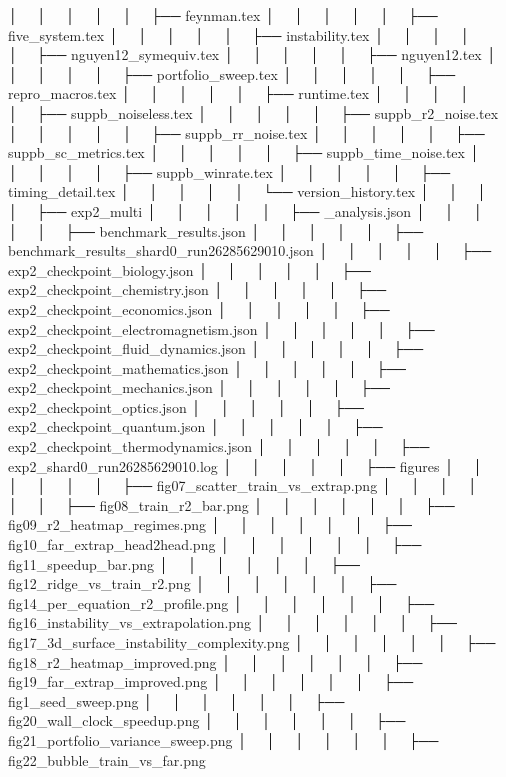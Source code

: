 │   │       │   │   │       ├── feynman.tex
│   │       │   │   │       ├── five_system.tex
│   │       │   │   │       ├── instability.tex
│   │       │   │   │       ├── nguyen12_symequiv.tex
│   │       │   │   │       ├── nguyen12.tex
│   │       │   │   │       ├── portfolio_sweep.tex
│   │       │   │   │       ├── repro_macros.tex
│   │       │   │   │       ├── runtime.tex
│   │       │   │   │       ├── suppb_noiseless.tex
│   │       │   │   │       ├── suppb_r2_noise.tex
│   │       │   │   │       ├── suppb_rr_noise.tex
│   │       │   │   │       ├── suppb_sc_metrics.tex
│   │       │   │   │       ├── suppb_time_noise.tex
│   │       │   │   │       ├── suppb_winrate.tex
│   │       │   │   │       ├── timing_detail.tex
│   │       │   │   │       └── version_history.tex
│   │       │   │   ├── exp2_multi
│   │       │   │   │   ├── _analysis.json
│   │       │   │   │   ├── benchmark_results.json
│   │       │   │   │   ├── benchmark_results_shard0_run26285629010.json
│   │       │   │   │   ├── exp2_checkpoint_biology.json
│   │       │   │   │   ├── exp2_checkpoint_chemistry.json
│   │       │   │   │   ├── exp2_checkpoint_economics.json
│   │       │   │   │   ├── exp2_checkpoint_electromagnetism.json
│   │       │   │   │   ├── exp2_checkpoint_fluid_dynamics.json
│   │       │   │   │   ├── exp2_checkpoint_mathematics.json
│   │       │   │   │   ├── exp2_checkpoint_mechanics.json
│   │       │   │   │   ├── exp2_checkpoint_optics.json
│   │       │   │   │   ├── exp2_checkpoint_quantum.json
│   │       │   │   │   ├── exp2_checkpoint_thermodynamics.json
│   │       │   │   │   ├── exp2_shard0_run26285629010.log
│   │       │   │   │   ├── figures
│   │       │   │   │   │   ├── fig07_scatter_train_vs_extrap.png
│   │       │   │   │   │   ├── fig08_train_r2_bar.png
│   │       │   │   │   │   ├── fig09_r2_heatmap_regimes.png
│   │       │   │   │   │   ├── fig10_far_extrap_head2head.png
│   │       │   │   │   │   ├── fig11_speedup_bar.png
│   │       │   │   │   │   ├── fig12_ridge_vs_train_r2.png
│   │       │   │   │   │   ├── fig14_per_equation_r2_profile.png
│   │       │   │   │   │   ├── fig16_instability_vs_extrapolation.png
│   │       │   │   │   │   ├── fig17_3d_surface_instability_complexity.png
│   │       │   │   │   │   ├── fig18_r2_heatmap_improved.png
│   │       │   │   │   │   ├── fig19_far_extrap_improved.png
│   │       │   │   │   │   ├── fig1_seed_sweep.png
│   │       │   │   │   │   ├── fig20_wall_clock_speedup.png
│   │       │   │   │   │   ├── fig21_portfolio_variance_sweep.png
│   │       │   │   │   │   ├── fig22_bubble_train_vs_far.png
